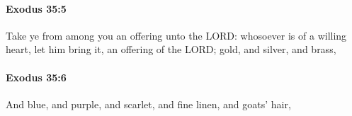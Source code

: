 		\paragraph{Exodus 35:5} %
			\label{EXODUS-35-5}

			Take ye from among you an offering unto the LORD: whosoever is of a willing heart, let him bring it, an offering of the LORD; gold, and silver, and brass,


		\paragraph{Exodus 35:6} %
			\label{EXODUS-35-6}

			And blue, and purple, and scarlet, and fine linen, and goats' hair,


